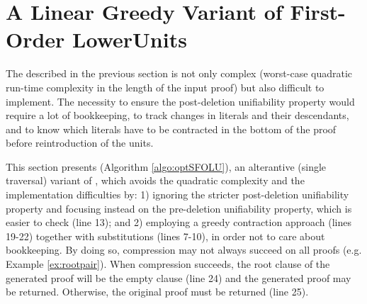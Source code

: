 
\section{A Linear Greedy Variant of First-Order LowerUnits}
\label{sec:SimpleFOLU}

The {\FOLowerUnits} described in the previous section is not only complex (worst-case quadratic run-time complexity in the length of the input proof) but also difficult to implement. The necessity to ensure the post-deletion unifiability property would require a lot of bookkeeping, to track changes in literals and their descendants, and to know which literals have to be contracted in the bottom of the proof before reintroduction of the units. 

This section presents {\SFOLowerUnits} (Algorithm \ref{algo:optSFOLU}), an alterantive (single traversal) variant of {\FOLowerUnits}, which avoids the quadratic complexity and the implementation difficulties by: 1) ignoring the stricter post-deletion unifiability property and focusing instead on the pre-deletion unifiability property, which is easier to check (line 13); and 2) employing a greedy contraction approach (lines 19-22) together with substitutions (lines 7-10), in order not to care about bookkeeping. By doing so, compression may not always succeed on all proofs (e.g. Example \ref{ex:rootpair}). When compression succeeds, the root clause of the generated proof will be the empty clause (line 24) and the generated proof may be returned. Otherwise, the original proof must be returned (line 25).


